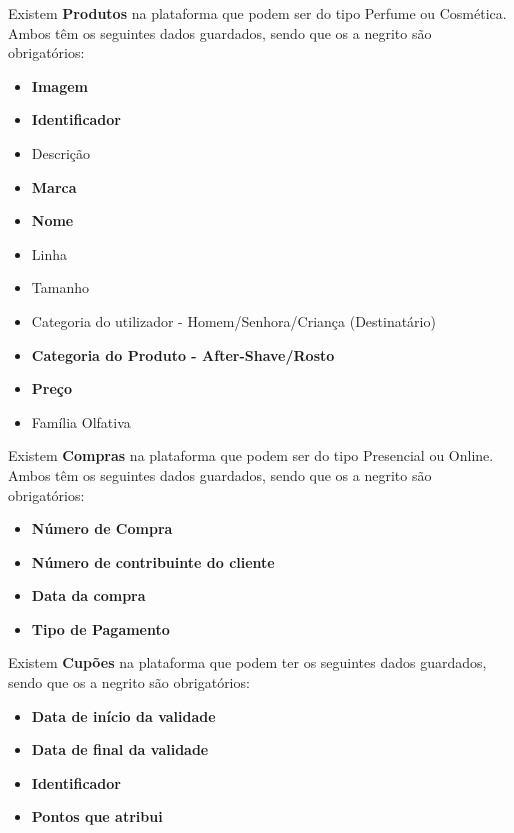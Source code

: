 \documentclass[10pt,portuguese]{article}
\begin{document}
\par Existem \textbf{Produtos} na plataforma que podem ser do tipo Perfume ou Cosmética. Ambos têm os seguintes dados guardados, sendo que os a negrito são obrigatórios:

\begin{itemize}
    \item \textbf{Imagem}
    \item \textbf{Identificador}
    \item Descrição
    \item \textbf{Marca}
     \item \textbf{Nome}
     \item Linha 
     \item Tamanho
     \item Categoria do utilizador - Homem/Senhora/Criança (Destinatário)
     \item \textbf{Categoria do Produto - After-Shave/Rosto}
     \item \textbf{Preço}
     \item Família Olfativa
\end{itemize}

\par Existem \textbf{Compras} na plataforma que podem ser do tipo Presencial ou Online. Ambos  têm os seguintes dados guardados, sendo que os a negrito são obrigatórios:

\begin{itemize}
    \item \textbf{Número de Compra}
    \item \textbf{Número de contribuinte do cliente}
    \item \textbf{Data da compra}
    \item \textbf{Tipo de Pagamento}
\end{itemize}

\par Existem \textbf{Cupões} na plataforma que podem ter os seguintes dados guardados, sendo que os a negrito são obrigatórios:

\begin{itemize}
    \item \textbf{Data de início da validade}
    \item \textbf{Data de final da validade}
    \item \textbf{Identificador}
    \item \textbf{Pontos que atribui}
\end{itemize}
\end{document}
